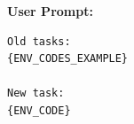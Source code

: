 \textbf{User Prompt:}
\begin{lstlisting}[language={}]
Old tasks:
{ENV_CODES_EXAMPLE}

New task:
{ENV_CODE}
\end{lstlisting}
